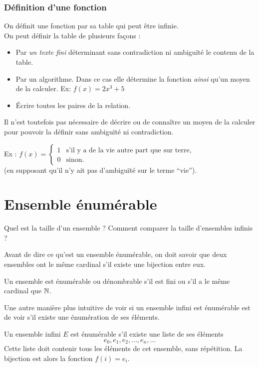 \subsubsection{Définition d'une fonction}
\label{par:d_finition_d_une_fonciton}
On définit une fonction par sa table qui peut être infinie.\\
On peut définir la table de plusieurs façons :
\begin{itemize}
	\item Par \emph{un texte fini} déterminant sans contradiction ni ambiguïté le contenu
		de la table.
	\item Par un algorithme. Dans ce cas elle détermine la fonction \textit{ainsi} qu'un moyen de la calculer.
		\subitem Ex: $f(x) = 2x^3+5$
	\item Écrire toutes les paires de la relation.
\end{itemize}
Il n'est toutefois pas nécessaire de décrire ou de connaître un moyen de la calculer
pour pouvoir la définir sans ambiguïté ni contradiction.

Ex : $f(x) = \left\{\begin{array}{ll} 1 & \text{s'il y a de la vie autre part que sur terre,} \\ 0 & \text{sinon.}\end{array}\right.$\\(en supposant qu'il n'y ait pas d'ambiguïté sur le terme ``vie'').\\

\section{Ensemble énumérable}
\label{sec:ensemble_num_rables}
Quel est la taille d'un ensemble ?  Comment comparer la taille d'ensembles infinis ?

Avant de dire ce qu'est un ensemble énumérable, on doit savoir que deux ensembles
ont le même cardinal s'il existe une bijection entre eux.

\begin{mydef}
	Un ensemble est énumérable ou dénombrable s'il est fini ou s'il a le même cardinal que $\mathbb{N}$.
\end{mydef}
Une autre manière plus intuitive de voir si un ensemble infini est énumérable est de voir s'il existe une énumération de ses éléments.

\begin{myprop}
Un ensemble infini $E$ est énumérable s'il existe une liste de ses éléments
\[
e_0, e_1, e_2, \ldots , e_n, \ldots
\]
Cette liste doit contenir tous les éléments de cet ensemble, sans répétition.  La bijection est alors la fonction $f(i) = e_i$.
\end{myprop}

